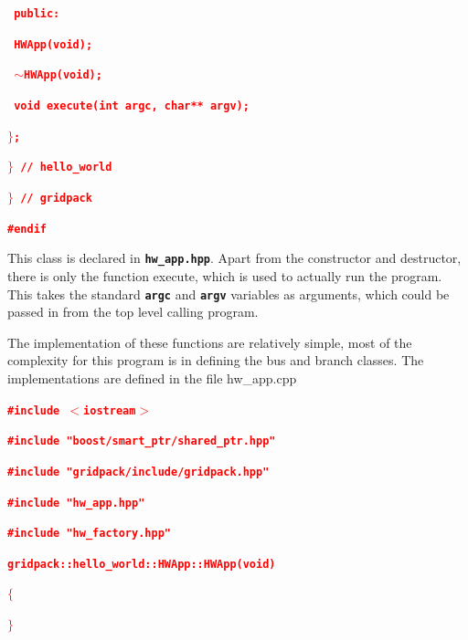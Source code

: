 \documentclass[12pt]{report} %
\begin{document}
\textcolor{red}{\texttt{\textbf{  public:}}}

\textcolor{red}{\texttt{\textbf{    HWApp(void);}}}

\textcolor{red}{\texttt{\textbf{    $\boldsymbol{\mathrm{\sim}}$HWApp(void);}}}

\textcolor{red}{\texttt{\textbf{    void execute(int argc, char** argv);}}}

\textcolor{red}{\texttt{\textbf{$\boldsymbol{\mathrm{\}}}$;}}}

\textcolor{red}{\texttt{\textbf{}}}

\textcolor{red}{\texttt{\textbf{$\boldsymbol{\mathrm{\}}}$ // hello\_world}}}

\textcolor{red}{\texttt{\textbf{$\boldsymbol{\mathrm{\}}}$ // gridpack}}}

\textcolor{red}{\texttt{\textbf{\#endif}}}

This class is declared in \texttt{\textbf{hw\_app.hpp}}. Apart from the constructor and destructor, there is only the function execute, which is used to actually run the program. This takes the standard \texttt{\textbf{argc}} and \texttt{\textbf{argv}} variables as arguments, which could be passed in from the top level calling program.

The implementation of these functions are relatively simple, most of the complexity for this program is in defining the bus and branch classes. The implementations are defined in the file hw\_app.cpp

\textcolor{red}{\texttt{\textbf{\#include $\boldsymbol{\mathrm{<}}$iostream$\boldsymbol{\mathrm{>}}$}}}

\textcolor{red}{\texttt{\textbf{\#include "boost/smart\_ptr/shared\_ptr.hpp"}}}

\textcolor{red}{\texttt{\textbf{\#include "gridpack/include/gridpack.hpp"}}}

\textcolor{red}{\texttt{\textbf{\#include "hw\_app.hpp"}}}

\textcolor{red}{\texttt{\textbf{\#include "hw\_factory.hpp"}}}

\textcolor{red}{\texttt{\textbf{}}}

\textcolor{red}{\texttt{\textbf{gridpack::hello\_world::HWApp::HWApp(void)}}}

\textcolor{red}{\texttt{\textbf{$\boldsymbol{\mathrm{\{}}$}}}

\textcolor{red}{\texttt{\textbf{$\boldsymbol{\mathrm{\}}}$}}}

\textcolor{red}{\texttt{\textbf{}}}
\end{document}
